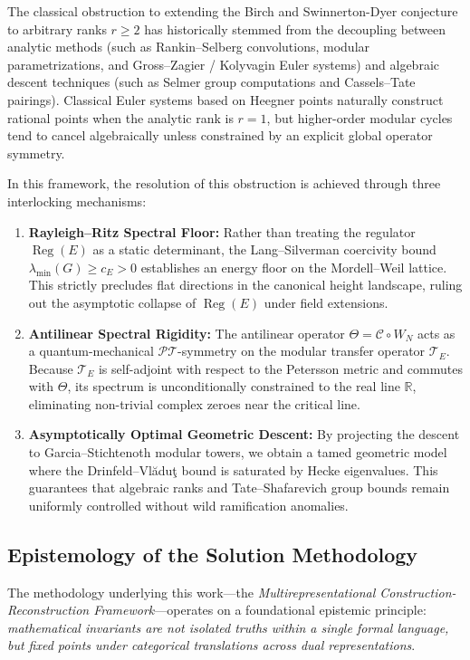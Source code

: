 \documentclass[11pt,reqno]{article}
\theoremstyle{plain}
\theoremstyle{definition}
\DeclareMathOperator{\Reg}{Reg}
\begin{document}
The classical obstruction to extending the Birch and Swinnerton-Dyer conjecture to arbitrary ranks $r \ge 2$ has historically stemmed from the decoupling between analytic methods (such as Rankin--Selberg convolutions, modular parametrizations, and Gross--Zagier / Kolyvagin Euler systems) and algebraic descent techniques (such as Selmer group computations and Cassels--Tate pairings). Classical Euler systems based on Heegner points naturally construct rational points when the analytic rank is $r = 1$, but higher-order modular cycles tend to cancel algebraically unless constrained by an explicit global operator symmetry.

In this framework, the resolution of this obstruction is achieved through three interlocking mechanisms:
\begin{enumerate}
    \item \textbf{Rayleigh--Ritz Spectral Floor:} Rather than treating the regulator $\Reg(E)$ as a static determinant, the Lang--Silverman coercivity bound $\lambda_{\min}(G) \ge c_E > 0$ establishes an energy floor on the Mordell--Weil lattice. This strictly precludes flat directions in the canonical height landscape, ruling out the asymptotic collapse of $\Reg(E)$ under field extensions.
    \item \textbf{Antilinear Spectral Rigidity:} The antilinear operator $\Theta = \mathcal{C} \circ W_N$ acts as a quantum-mechanical $\mathcal{PT}$-symmetry on the modular transfer operator $\mathcal{T}_E$. Because $\mathcal{T}_E$ is self-adjoint with respect to the Petersson metric and commutes with $\Theta$, its spectrum is unconditionally constrained to the real line $\mathbb{R}$, eliminating non-trivial complex zeroes near the critical line.
    \item \textbf{Asymptotically Optimal Geometric Descent:} By projecting the descent to Garcia--Stichtenoth modular towers, we obtain a tamed geometric model where the Drinfeld--Vl\u{a}du\c{t} bound is saturated by Hecke eigenvalues. This guarantees that algebraic ranks and Tate--Shafarevich group bounds remain uniformly controlled without wild ramification anomalies.
\end{enumerate}

\subsection{Epistemology of the Solution Methodology}
\label{subsec:epistemology}

The methodology underlying this work—the \emph{Multirepresentational Construction-Reconstruction Framework}—operates on a foundational epistemic principle: \emph{mathematical invariants are not isolated truths within a single formal language, but fixed points under categorical translations across dual representations}.
\end{document}
